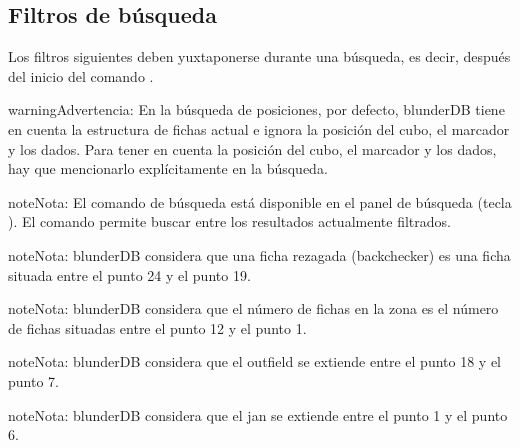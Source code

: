 \documentclass[letterpaper,10pt,spanish]{sphinxmanual}
\begin{document}
\subsection{Filtros de búsqueda}
\label{\detokenize{cmd_mode:filtres-de-recherche}}\label{\detokenize{cmd_mode:cmd-filter}}
\sphinxAtStartPar
Los filtros siguientes deben yuxtaponerse durante una búsqueda, es decir, después del inicio del comando .

\label{\detokenize{cmd_mode:cmd-filter-pos}}
\begin{sphinxadmonition}{warning}{Advertencia:}
\sphinxAtStartPar
En la búsqueda de posiciones, por defecto, blunderDB tiene en cuenta la estructura de fichas actual e ignora la posición del cubo, el marcador y los dados. Para tener en cuenta la posición del cubo, el marcador y los dados, hay que mencionarlo explícitamente en la búsqueda.
\end{sphinxadmonition}

\begin{sphinxadmonition}{note}{Nota:}
\sphinxAtStartPar
El comando de búsqueda  está disponible en el panel de búsqueda (tecla ). El comando  permite buscar entre los resultados actualmente filtrados.
\end{sphinxadmonition}

\begin{sphinxadmonition}{note}{Nota:}
\sphinxAtStartPar
blunderDB considera que una ficha rezagada (backchecker) es una ficha situada entre el punto 24 y el punto 19.
\end{sphinxadmonition}

\begin{sphinxadmonition}{note}{Nota:}
\sphinxAtStartPar
blunderDB considera que el número de fichas en la zona es el número de fichas situadas entre el punto 12 y el punto 1.
\end{sphinxadmonition}

\begin{sphinxadmonition}{note}{Nota:}
\sphinxAtStartPar
blunderDB considera que el outfield se extiende entre el punto 18 y el punto 7.
\end{sphinxadmonition}

\begin{sphinxadmonition}{note}{Nota:}
\sphinxAtStartPar
blunderDB considera que el jan se extiende entre el punto 1 y el punto 6.
\end{sphinxadmonition}
\end{document}
